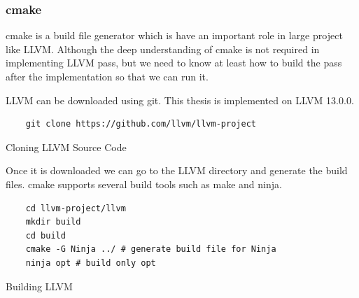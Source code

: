 \subsubsection{cmake}

cmake is a build file generator which is have an important role in large project like LLVM. Although the deep understanding of cmake is not required in implementing LLVM pass, but we need to know at least how to build the pass after the implementation so that we can run it.

LLVM can be downloaded using git. This thesis is implemented on LLVM 13.0.0.

\begin{listing}
\begin{verbatim}
    git clone https://github.com/llvm/llvm-project
\end{verbatim}
\caption{Cloning LLVM Source Code}    
\label{listing:2-9}
\end{listing}

Once it is downloaded we can go to the LLVM directory and generate the build files. cmake supports several build tools such as make and ninja. 

\begin{listing}
\begin{verbatim}
    cd llvm-project/llvm
    mkdir build
    cd build
    cmake -G Ninja ../ # generate build file for Ninja
    ninja opt # build only opt
\end{verbatim}
\caption{Building LLVM}    
\label{listing:2-10}
\end{listing}